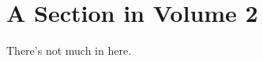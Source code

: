 \documentclass[]{article}
\begin{document}
\section{A Section in Volume 2}\label{sec1}
There's not much in here.
\end{document}
